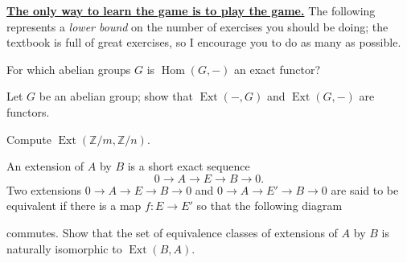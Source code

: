 \documentclass[12pt]{pset}
\author{Jim Fowler}
\date{Spring 2012}
\newcommand{\Z}{\mathbb{Z}}
\DeclareMathOperator{\Ext}{Ext}
\DeclareMathOperator{\Hom}{Hom}
\begin{document}
\maketitle

\noindent\textbf{\href{http://en.wikipedia.org/wiki/List_of_games_with_concealed_rules}{The only way to learn the game is to play the game.}}
The following represents a \textit{lower bound} on the number of
exercises you should be doing; the textbook is full of great
exercises, so I encourage you to do as many as possible.


\begin{problem}
  For which abelian groups $G$ is $\Hom(G,-)$ an exact functor?
\end{problem}

\begin{problem}
  Let $G$ be an abelian group; show that $\Ext(-,G)$ and $\Ext(G,-)$ are functors.
\end{problem}

\begin{problem}
  Compute $\Ext(\Z/m,\Z/n)$.
\end{problem}

\begin{problem}
  An extension of $A$ by $B$ is a short exact sequence
  $$
  0 \to A \to E \to B \to 0.
  $$
  Two extensions $0 \to A \to E \to B \to 0$ and $0 \to A \to E' \to B
  \to 0$ are said to be equivalent if there is a map $f : E \to E'$ so
  that the following diagram
  \begin{center}
\end{center}
commutes.  Show that the set of equivalence classes of extensions of
$A$ by $B$ is naturally isomorphic to $\Ext(B,A)$.
\end{problem}
\end{document}
